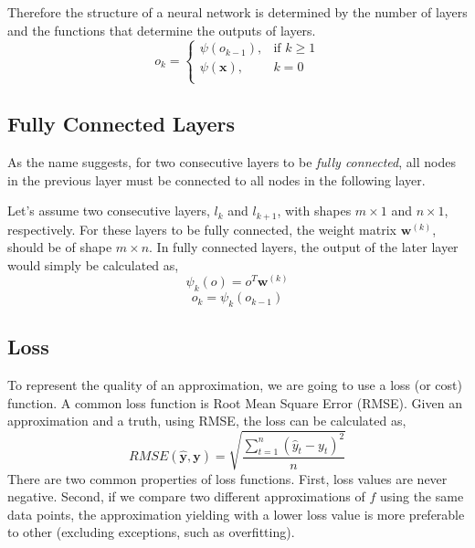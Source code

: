 Therefore the structure of a neural network is determined by the number of layers and the functions that determine the outputs of layers.
\begin{equation}
\label{eq:output_of_layers}
    o_k = 
\begin{cases}
    \psi(o_{k-1}), &\text{if } k\geq 1\\
    \psi(\mathbf{x}),& k = 0\\
\end{cases}
\end{equation}
\iffalse
Assume a target function $f$ that we want to approximate. First, to learn to approximate this function, we will need samples. These samples are called as the \textit{dataset}. Let's assume that $f$ has two input variables represented by an input vector ($\mathbf{x}$) and a scalar output ($y$).

\begin{equation*}
f(\mathbf{x}) = y
\end{equation*}
\fi
\subsection{Fully Connected Layers}
As the name suggests, for two consecutive layers to be \textit{fully connected}, all nodes in the previous layer must be connected to all nodes in the following layer. 

Let's assume two consecutive layers, $l_{k}$ and $l_{k+1}$, with shapes $m \times 1$ and $n \times 1$, respectively. For these layers to be fully connected, the weight matrix $\mathbf{w}^{(k)}$, should be of shape $m \times n$. In fully connected layers, the output of the later layer would simply be calculated as,
$$ \psi_k(o) = o^T\mathbf{w}^{(k)} $$
$$ o_k = \psi_k(o_{k-1}) $$

\subsection{Loss}

To represent the quality of an approximation, we are going to use a loss (or cost) function. A common loss function is Root Mean Square Error (RMSE). Given an approximation and a truth, using RMSE, the loss can be calculated as,
\begin{equation*}
RMSE(\mathbf{\hat y}, \mathbf{y}) = \sqrt{\frac{\sum^n_{t=1} (\hat y_t - y_t)^2 }{n}}
\end{equation*}
There are two common properties of loss functions. First, loss values are never negative. Second, if we compare two different approximations of $f$ using the same data points, the approximation yielding with a lower loss value is more preferable to other (excluding exceptions, such as overfitting).

